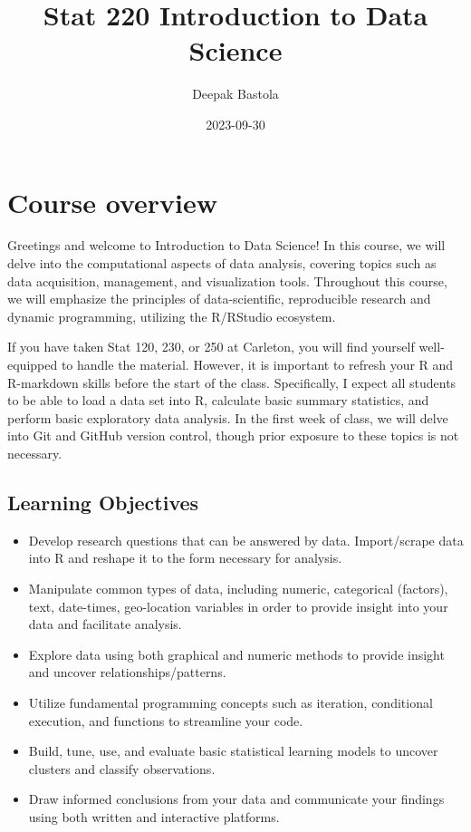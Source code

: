 \documentclass[
]{book}
\title{Stat 220 Introduction to Data Science}
\author{Deepak Bastola}
\date{2023-09-30}
\providecommand{\tightlist}{%
  \setlength{\itemsep}{0pt}\setlength{\parskip}{0pt}}
\begin{document}
\maketitle

{
\setcounter{tocdepth}{1}
\tableofcontents
}
\hypertarget{course-overview}{%
\chapter*{Course overview}\label{course-overview}}

Greetings and welcome to Introduction to Data Science! In this course, we will delve into the computational aspects of data analysis, covering topics such as data acquisition, management, and visualization tools. Throughout this course, we will emphasize the principles of data-scientific, reproducible research and dynamic programming, utilizing the R/RStudio ecosystem.

If you have taken Stat 120, 230, or 250 at Carleton, you will find yourself well-equipped to handle the material. However, it is important to refresh your R and R-markdown skills before the start of the class. Specifically, I expect all students to be able to load a data set into R, calculate basic summary statistics, and perform basic exploratory data analysis. In the first week of class, we will delve into Git and GitHub version control, though prior exposure to these topics is not necessary.

\hypertarget{learning-objectives}{%
\section{Learning Objectives}\label{learning-objectives}}

\begin{itemize}
\tightlist
\item
  Develop research questions that can be answered by data. Import/scrape data into R and reshape it to the form necessary for analysis.
\item
  Manipulate common types of data, including numeric, categorical (factors), text, date-times, geo-location variables in order to provide insight into your data and facilitate analysis.
\item
  Explore data using both graphical and numeric methods to provide insight and uncover relationships/patterns.
\item
  Utilize fundamental programming concepts such as iteration, conditional execution, and functions to streamline your code.
\item
  Build, tune, use, and evaluate basic statistical learning models to uncover clusters and classify observations.
\item
  Draw informed conclusions from your data and communicate your findings using both written and interactive platforms.
\end{itemize}
\end{document}
